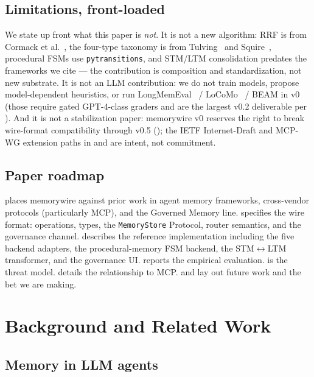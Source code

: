 \documentclass[11pt,letterpaper,twocolumn]{article}
\begin{document}
\subsection{Limitations, front-loaded}
\label{sec:intro-limitations}

We state up front what this paper is \emph{not}. It is not a new algorithm: RRF is from Cormack et al.~\cite{cormack2009rrf}, the four-type taxonomy is from Tulving~\cite{tulving1972episodic} and Squire~\cite{squire1992declarative}, procedural FSMs use \texttt{pytransitions}, and STM/LTM consolidation predates the frameworks we cite --- the contribution is composition and standardization, not new substrate. It is not an LLM contribution: we do not train models, propose model-dependent heuristics, or run LongMemEval~\cite{wu2024longmemeval} / LoCoMo~\cite{maharana2024locomo} / BEAM in v0 (those require gated GPT-4-class graders and are the largest v0.2 deliverable per ). And it is not a stabilization paper: memorywire v0 reserves the right to break wire-format compatibility through v0.5 (); the IETF Internet-Draft and MCP-WG extension paths in  and  are intent, not commitment.

\subsection{Paper roadmap}
\label{sec:intro-roadmap}

 places memorywire against prior work in agent memory frameworks, cross-vendor protocols (particularly MCP), and the Governed Memory line.  specifies the wire format: operations, types, the \texttt{MemoryStore} Protocol, router semantics, and the governance channel.  describes the reference implementation including the five backend adapters, the procedural-memory FSM backend, the STM$\leftrightarrow$LTM transformer, and the governance UI.  reports the empirical evaluation.  is the threat model.  details the relationship to MCP.  and  lay out future work and the bet we are making.

\section{Background and Related Work}
\label{sec:related}

\subsection{Memory in LLM agents}
\end{document}
